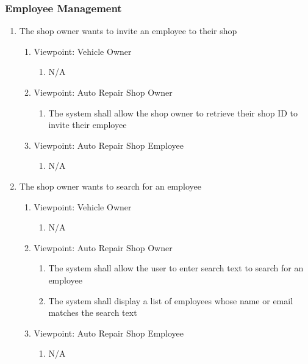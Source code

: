 \documentclass[12pt]{article}
\begin{document}
\subsubsection{Employee Management}
\begin{enumerate}[resume*=business_events]
	\item The shop owner wants to invite an employee to their shop
	      \begin{enumerate}[VP\arabic*.]
		      \item Viewpoint: Vehicle Owner
		            \begin{enumerate}
			            \item[] N/A
		            \end{enumerate}
		      \item Viewpoint: Auto Repair Shop Owner
		            \begin{enumerate}
			            \item The system shall allow the shop owner to retrieve their shop ID to invite their employee
		            \end{enumerate}
		      \item Viewpoint: Auto Repair Shop Employee
		            \begin{enumerate}
			            \item[] N/A
		            \end{enumerate}
	      \end{enumerate}

	\item The shop owner wants to search for an employee
	      \begin{enumerate}[VP\arabic*.]
		      \item Viewpoint: Vehicle Owner
		            \begin{enumerate}
			            \item[] N/A
		            \end{enumerate}
		      \item Viewpoint: Auto Repair Shop Owner
		            \begin{enumerate}
			            \item The system shall allow the user to enter search text to search for an employee
			            \item The system shall display a list of employees whose name or email matches the search text
		            \end{enumerate}
		      \item Viewpoint: Auto Repair Shop Employee
		            \begin{enumerate}
			            \item[] N/A
		            \end{enumerate}
	      \end{enumerate}


\end{enumerate}
\end{document}
